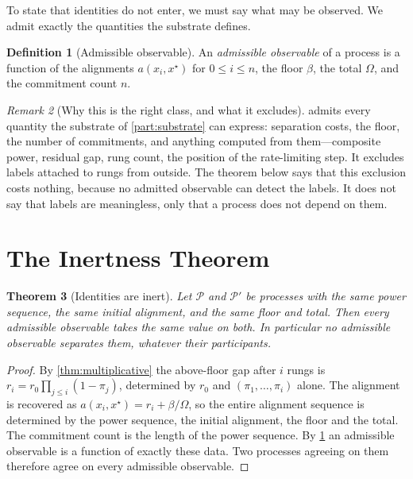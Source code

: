 \documentclass[11pt,twocolumn,a4paper]{article}
\theoremstyle{plain}
\newtheorem{theorem}{Theorem}[section]
\theoremstyle{definition}
\newtheorem{definition}[theorem]{Definition}
\theoremstyle{remark}
\newtheorem{remark}[theorem]{Remark}
\newcommand{\flo}{\beta}
\newcommand{\pow}{\pi}
\newcommand{\gap}{r}
\newcommand{\Tot}{\Omega}
\newcommand{\Prop}{\mathcal{P}}
\newcommand{\target}{x^{\star}}
\begin{document}
To state that identities do not enter, we must say what may be observed. We
admit exactly the quantities the substrate defines.

\begin{definition}[Admissible observable]
\label{def:observable}
An \emph{admissible observable} of a process is a function of the alignments
$a(x_i,\target)$ for $0 \leq i \leq n$, the floor $\flo$, the total $\Tot$, and
the commitment count $n$.
\end{definition}

\begin{remark}[Why this is the right class, and what it excludes]
\label{rem:obsclass}
 admits every quantity the substrate of
\cref{part:substrate} can express: separation costs, the floor, the number of
commitments, and anything computed from them---composite power, residual gap,
rung count, the position of the rate-limiting step. It excludes labels attached
to rungs from outside. The theorem below says that this exclusion costs nothing,
because no admitted observable can detect the labels. It does not say that
labels are meaningless, only that a process does not depend on them.
\end{remark}

\section{The Inertness Theorem}
\label{sec:inertness}

\begin{theorem}[Identities are inert]
\label{thm:inertness}
Let $\Prop$ and $\Prop'$ be processes with the same power sequence, the same
initial alignment, and the same floor and total. Then every admissible
observable takes the same value on both. In particular no admissible observable
separates them, whatever their participants.
\end{theorem}

\begin{proof}
By \cref{thm:multiplicative} the above-floor gap after $i$ rungs is
$\gap_i = \gap_0\prod_{j\leq i}(1-\pow_j)$, determined by $\gap_0$ and
$(\pow_1,\dots,\pow_i)$ alone. The alignment is recovered as
$a(x_i,\target) = \gap_i + \flo/\Tot$, so the entire alignment sequence is
determined by the power sequence, the initial alignment, the floor and the
total. The commitment count is the length of the power sequence. By
\cref{def:observable} an admissible observable is a function of exactly these
data. Two processes agreeing on them therefore agree on every admissible
observable.
\end{proof}
\end{document}
